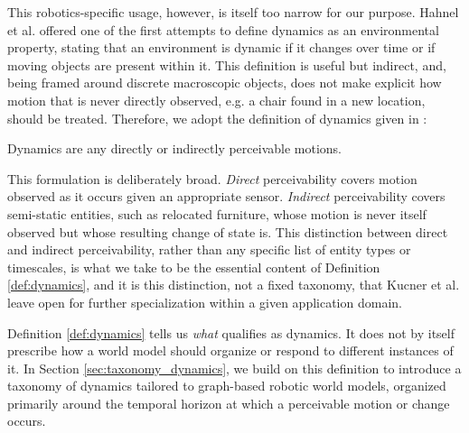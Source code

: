 This robotics-specific usage, however, is itself too narrow for our purpose.
Hahnel et al. \cite{hahnel2003map} offered one of the first attempts to define dynamics as an environmental property, stating that an environment is dynamic if it changes over time or if moving objects are present within it. 
This definition is useful but indirect, and, being framed around discrete macroscopic objects, does not make explicit how motion that is never directly observed, e.g. a chair found in a new location, should be treated. Therefore, we adopt the definition of dynamics given in \cite{kucner_survey_2023}:
\vspace{6pt}
\begin{definition}[Dynamics]
\label{def:dynamics}
    Dynamics are any directly or indirectly perceivable motions.
\end{definition}
\vspace{6pt}
This formulation is deliberately broad. \textit{Direct} perceivability covers motion observed as it occurs given an appropriate sensor.
\textit{Indirect} perceivability covers semi-static entities, such as relocated furniture, whose motion is never itself observed but whose resulting change of state is.
This distinction between direct and indirect perceivability, rather than any specific list of entity types or timescales, is what we take to be the essential content of Definition \ref{def:dynamics}, and it is this distinction, not a fixed taxonomy, that Kucner et al. \cite{kucner_survey_2023} leave open for further specialization within a given application domain.

Definition \ref{def:dynamics} tells us \textit{what} qualifies as dynamics. It does not by itself prescribe how a world model should organize or respond to different instances of it.
In Section \ref{sec:taxonomy_dynamics}, we build on this definition to introduce a taxonomy of dynamics tailored to graph-based robotic world models, organized primarily around the temporal horizon at which a perceivable motion or change occurs.

